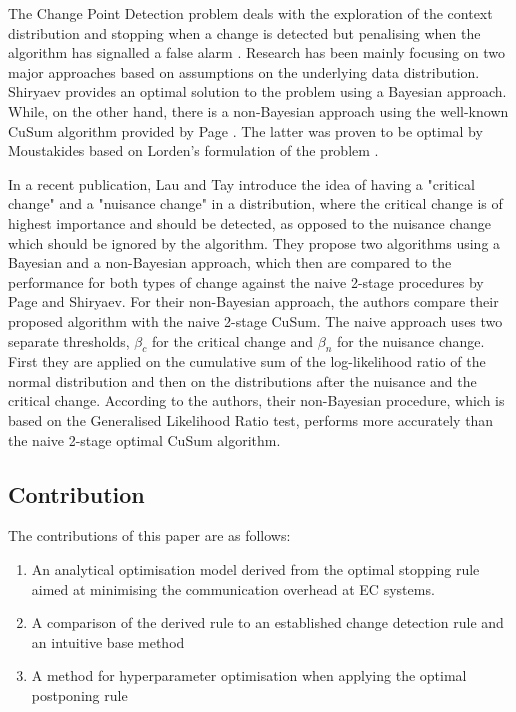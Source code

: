 \documentclass{mpaper}
\begin{document}
The Change Point Detection problem deals with the exploration of the context distribution and stopping when a change is detected but penalising when the algorithm has signalled a false alarm \cite{UCLAbook}. Research has been mainly focusing on two major approaches based on assumptions on the underlying data distribution. 
Shiryaev \cite{shiryaev1963} provides an optimal solution to the problem using a Bayesian approach. While, on the other hand, there is a non-Bayesian approach using the well-known CuSum algorithm provided by Page \cite{page1954}. The latter was proven to be optimal by Moustakides \cite{moustakides1986} based on Lorden's formulation of the problem \cite{lorden1971}.

In a recent publication, Lau and Tay\cite{lautay2018} introduce the idea of having a "critical change" and a "nuisance change" in a distribution, where the critical change is of highest importance and should be detected, as opposed to the nuisance change which should be ignored by the algorithm. They propose two algorithms using a Bayesian and a non-Bayesian approach, which then are compared to the performance for both types of change against the naive 2-stage procedures by Page\cite{page1954} and Shiryaev\cite{shiryaev1963}.
For their non-Bayesian approach, the authors compare their proposed algorithm with the naive 2-stage CuSum. The naive approach uses two separate thresholds, $\beta_c$ for the critical change and $\beta_n$ for the nuisance change. First they are applied on the cumulative sum of the log-likelihood ratio of the normal distribution and then on the distributions after the nuisance and the critical change. According to the authors, their non-Bayesian procedure, which is based on the Generalised Likelihood Ratio test, performs more accurately than the naive 2-stage optimal CuSum algorithm.

\subsection{Contribution}
The contributions of this paper are as follows:
\begin{enumerate}
\item An analytical optimisation model derived from the optimal stopping rule aimed at minimising the communication overhead at EC systems.
\item A comparison of the derived rule to an established change detection rule and an intuitive base method
\item A method for hyperparameter optimisation when applying the optimal postponing rule
\end{enumerate}
\end{document}
